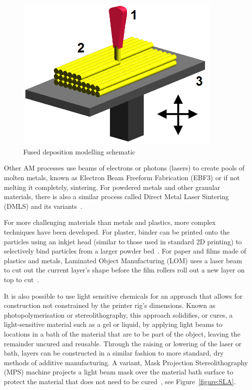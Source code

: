 \documentclass[pdftex, 11pt]{report} %
\begin{document}
\begin{figure}[H]
  \centering
  \includegraphics[width=4in]{FDM_by_Zureks.png}
  \caption{Fused deposition modelling schematic~\cite{Zureks2008}}
  \label{figure:FDM}
\end{figure}

Other AM processes use beams of electrons or photons (lasers) to create pools of molten metals, known as Electron Beam Freeform Fabrication (EBF3) or if not melting it completely, sintering. For powdered metals and other granular materials, there is also a similar process called Direct Metal Laser Sintering (DMLS) and its variants~\cite{Hopkinson2006}.

For more challenging materials than metals and plastics, more complex techniques have been developed. For plaster, binder can be printed onto the particles using an inkjet head (similar to those used in standard 2D printing) to selectively bind particles from a larger powder bed~\cite{Grimm2004}. For paper and films made of plastics and metals, Laminated Object Manufacturing (LOM) uses a laser beam to cut out the current layer's shape before the film rollers roll out a new layer on top to cut~\cite{THRE3D2014}.

It is also possible to use light sensitive chemicals for an approach that allows for construction not constrained by the printer rig's dimensions. Known as photopolymerisation or stereolithography, this approach solidifies, or cures, a light-sensitive material such as a gel or liquid, by applying light beams to locations in a bath of the material that are to be part of the object, leaving the remainder uncured and reusable. Through the raising or lowering of the laser or bath, layers can be constructed in a similar fashion to more standard, dry methods of additive manufacturing. A variant, Mask Projection Stereolithography (MPS) machine projects a light beam mask over the material bath surface to protect the material that does not need to be cured~\cite{Fourie}, see Figure~\ref{figure:SLA}.
\end{document}
